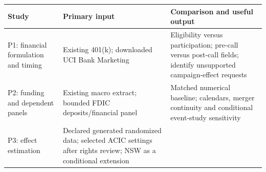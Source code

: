 \begin{longtable}[]{@{}>{\raggedright\arraybackslash}p{}>{\raggedright\arraybackslash}p{}>{\raggedright\arraybackslash}p{}@{}}
\toprule
\begin{minipage}[b]{\linewidth}\raggedright
Study\strut
\end{minipage} & \begin{minipage}[b]{\linewidth}\raggedright
Primary input\strut
\end{minipage} & \begin{minipage}[b]{\linewidth}\raggedright
Comparison and useful output\strut
\end{minipage}\tabularnewline
\midrule
\endhead
\begin{minipage}[t]{\linewidth}\raggedright
P1: financial formulation and timing\strut
\end{minipage} & \begin{minipage}[t]{\linewidth}\raggedright
Existing 401(k); downloaded UCI Bank Marketing\strut
\end{minipage} & \begin{minipage}[t]{\linewidth}\raggedright
Eligibility versus participation; pre-call versus post-call fields;
identify unsupported campaign-effect requests\strut
\end{minipage}\tabularnewline
\begin{minipage}[t]{\linewidth}\raggedright
P2: funding and dependent panels\strut
\end{minipage} & \begin{minipage}[t]{\linewidth}\raggedright
Existing macro extract; bounded FDIC deposits/financial panel\strut
\end{minipage} & \begin{minipage}[t]{\linewidth}\raggedright
Matched numerical baseline; calendars, merger continuity and conditional
event-study sensitivity\strut
\end{minipage}\tabularnewline
\begin{minipage}[t]{\linewidth}\raggedright
P3: effect estimation\strut
\end{minipage} & \begin{minipage}[t]{\linewidth}\raggedright
Declared generated randomized data; selected ACIC settings after rights
review; NSW as a conditional extension\strut
\end{minipage} & \begin{minipage}[t]{\linewidth}\raggedright

\end{minipage}
\end{longtable}
